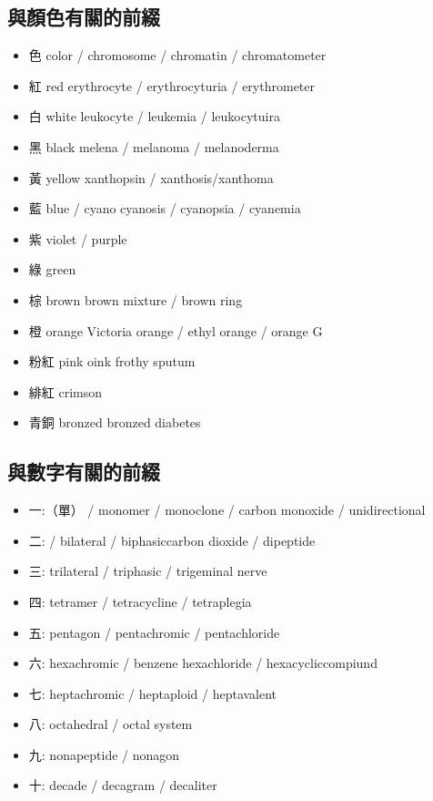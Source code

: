 \subsection{與顏色有關的前綴}
\begin{itemize}
  \itemsep0em
  \item 色 color  /  chromosome / chromatin / chromatometer
  \item 紅 red  erythrocyte / erythrocyturia / erythrometer
  \item 白 white  leukocyte / leukemia / leukocytuira
  \item 黑 black  melena / melanoma / melanoderma
  \item 黃 yellow  xanthopsin / xanthosis/xanthoma
  \item 藍 blue  / cyano cyanosis / cyanopsia / cyanemia
  \item 紫 violet / purple
  \item 綠 green
  \item 棕 brown brown mixture / brown ring
  \item 橙 orange Victoria orange / ethyl orange / orange G
  \item 粉紅 pink oink frothy sputum
  \item 緋紅 crimson
  \item 青銅 bronzed bronzed diabetes
\end{itemize}

\subsection{與數字有關的前綴}
\begin{itemize}
  \itemsep0em
  \item 一:（單）  /  monomer / monoclone / carbon monoxide / unidirectional 
  \item 二:  /  bilateral / biphasiccarbon dioxide / dipeptide 
  \item 三:  trilateral / triphasic / trigeminal nerve 
  \item 四:  tetramer / tetracycline / tetraplegia 
  \item 五:  pentagon / pentachromic / pentachloride 
  \item 六:  hexachromic / benzene hexachloride / hexacycliccompiund 
  \item 七:  heptachromic / heptaploid / heptavalent 
  \item 八:  octahedral / octal system 
  \item 九:  nonapeptide / nonagon 
  \item 十:  decade / decagram / decaliter
\end{itemize}

